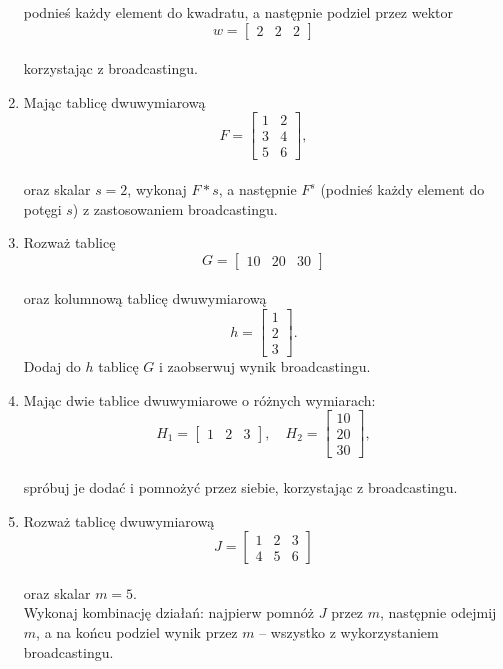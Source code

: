 \documentclass[
  letterpaper,
  DIV=11,
  numbers=noendperiod]{scrreprt}
\begin{document}
\begin{enumerate}
  podnieś każdy element do kwadratu, a następnie podziel przez wektor\\
  \[w = \begin{bmatrix}2 & 2 & 2\end{bmatrix}\]\\
  korzystając z broadcastingu.
\item
  Mając tablicę dwuwymiarową\\
  \[F = \begin{bmatrix}1 & 2 \\ 3 & 4 \\ 5 & 6\end{bmatrix},\]\\
  oraz skalar \(s = 2\), wykonaj \(F * s\), a następnie \(F^{s}\)
  (podnieś każdy element do potęgi \(s\)) z zastosowaniem broadcastingu.
\item
  Rozważ tablicę\\
  \[G = \begin{bmatrix}10 & 20 & 30\end{bmatrix}\]\\
  oraz kolumnową tablicę dwuwymiarową\\
  \[h = \begin{bmatrix}1 \\ 2 \\ 3\end{bmatrix}.\] Dodaj do \(h\)
  tablicę \(G\) i zaobserwuj wynik broadcastingu.
\item
  Mając dwie tablice dwuwymiarowe o różnych wymiarach:\\
  \[H_1 = \begin{bmatrix}1 & 2 & 3\end{bmatrix}, \quad H_2 = \begin{bmatrix}10 \\ 20 \\ 30\end{bmatrix},\]\\
  spróbuj je dodać i pomnożyć przez siebie, korzystając z broadcastingu.
\item
  Rozważ tablicę dwuwymiarową\\
  \[J = \begin{bmatrix}1 & 2 & 3 \\ 4 & 5 & 6\end{bmatrix}\]\\
  oraz skalar \(m = 5\).\\
  Wykonaj kombinację działań: najpierw pomnóż \(J\) przez \(m\),
  następnie odejmij \(m\), a na końcu podziel wynik przez \(m\) --
  wszystko z wykorzystaniem broadcastingu.
\end{enumerate}
\end{document}
